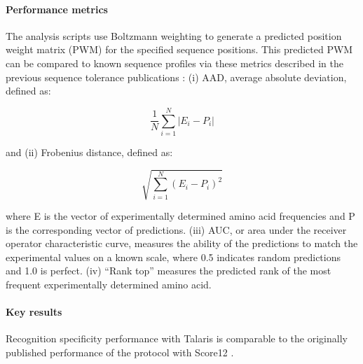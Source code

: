 \paragraph{Performance metrics}
The analysis scripts use Boltzmann weighting to generate a predicted position weight matrix (PWM) for the specified sequence positions. This predicted PWM can be compared to known sequence profiles via these metrics described in the previous sequence tolerance publications \cite{smith_predicting_2011,smith_structure-based_2010}: (i) AAD, average absolute deviation, defined as:

\begin{equation}
  \label{eq:bmark-aad}
  \frac{1}{N}\sum\limits_{i = 1}^N | {E_i} - {P_i}|
\end{equation}

and (ii) Frobenius distance, defined as:

\begin{equation}
  \label{eq:bmark-frob-dist}
  \sqrt {\sum\limits_{i = 1}^N {{{({E_i} - {P_i})}^2}} }
\end{equation}

where E is the vector of experimentally determined amino acid frequencies and P is the corresponding vector of predictions. (iii) AUC, or area under the receiver operator characteristic curve, measures the ability of the predictions to match the experimental values on a known scale, where 0.5 indicates random predictions and 1.0 is perfect. (iv) ``Rank top'' measures the predicted rank of the most frequent experimentally determined amino acid.

\paragraph{Key results}
Recognition specificity performance with Talaris is comparable to the originally published performance of the protocol with Score12 \cite{smith_predicting_2011,smith_structure-based_2010}.

